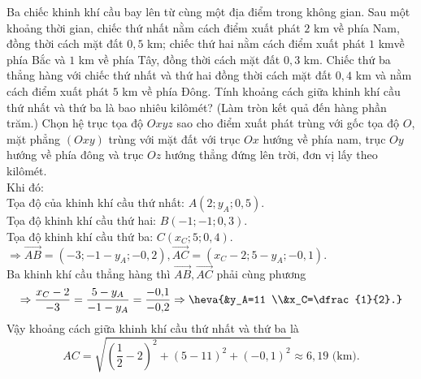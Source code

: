 \begin{bt}%
	Ba chiếc khinh khí cầu bay lên từ cùng một địa điểm trong không gian. Sau một khoảng thời gian, chiếc thứ nhất nằm cách điểm xuất phát $2$ km về phía Nam, đồng thời cách mặt đất $0{,}5$ km; chiếc thứ hai nằm cách điểm xuất phát $1$ kmvề phía Bắc và $1$ km về phía Tây, đồng thời cách mặt đất $0{,}3$ km. Chiếc thứ ba thẳng hàng với chiếc thứ nhất và thứ hai đồng thời cách mặt đất $0{,}4$ km và nằm cách điểm xuất phát $5$ km về phía Đông. Tính khoảng cách giữa khinh khí cầu thứ nhất và thứ ba là bao nhiêu kilômét? (Làm tròn kết quả đến hàng phần trăm.)
	\loigiai
	{
		Chọn hệ trục tọa độ $Oxyz$ sao cho điểm xuất phát trùng với gốc tọa độ $O$, mặt phẳng $\left(Oxy\right)$ trùng với mặt đất với trục $Ox$ hướng về phía nam, trục $Oy$ hướng về phía đông và trục $Oz$ hướng thẳng đứng lên trời, đơn vị lấy theo kilômét.\\
		Khi đó:\\
		Tọa độ của khinh khí cầu thứ nhất: $A\left(2;y_A;0{,}5\right)$.\\
		Tọa độ khinh khí cầu thứ hai: $B\left(-1;-1;0{,}3\right)$.\\
		Tọa độ khinh khí cầu thứ ba: $C\left(x_C;5;0{,}4\right)$.\\
		$\Rightarrow \overrightarrow{AB}=\left(-3;-1-y_A;-0{,}2\right),\overrightarrow{AC}=\left(x_C-2;5-y_A;-0{,}1\right)$.\\
		Ba khinh khí cầu thẳng hàng thì $\overrightarrow{AB},\overrightarrow{AC}$ phải cùng phương
		$$\Rightarrow \dfrac{x_C-2}{-3}=\dfrac{5-y_A}{-1-y_A}=\dfrac{-0{,}1}{-0{,}2}\Rightarrow \heva{&y_A=11 \\&x_C=\dfrac{1}{2}.}$$
		Vậy khoảng cách giữa khinh khí cầu thứ nhất và thứ ba là $$AC=\sqrt{\left(\dfrac{1}{2}-2\right)^2+\left(5-11\right)^2+\left(-0{,}1\right)^2}\approx 6{,}19\text{ (km).}$$
	}
\end{bt}

